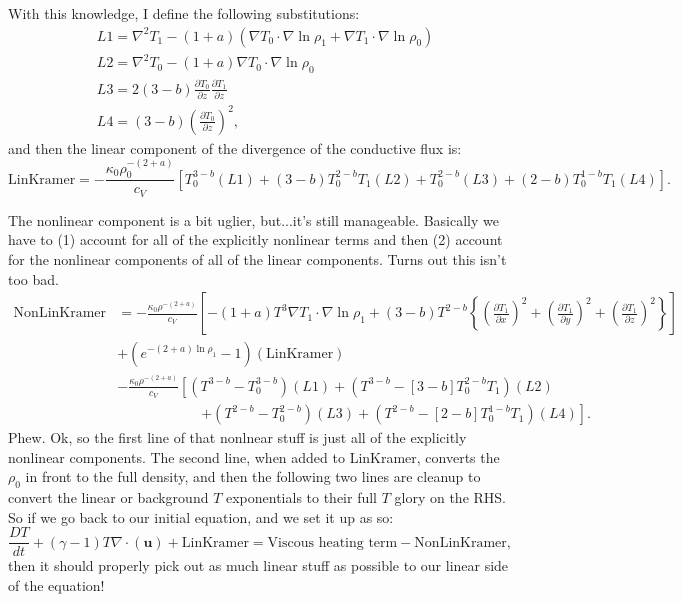 \documentclass[aps, pre, onecolumn, nofootinbib, notitlepage, groupedaddress, amsfonts, amssymb, amsmath, longbibliography]{revtex4-1}
\newcommand{\Div}[1]{\ensuremath{\nabla\cdot\left( #1\right)}}
\newcommand{\grad}{\ensuremath{\nabla}}
\begin{document}
With this knowledge, I define the following substitutions:
\begin{align*}
& L1 = \grad^2 T_1 - (1 + a)(\grad T_0\cdot\grad\ln\rho_1 + \grad T_1\cdot\grad\ln\rho_0) \\
& L2 = \grad^2 T_0 - (1 + a)\grad T_0\cdot\grad\ln\rho_0 \\
& L3 = 2(3-b)\frac{\partial T_0}{\partial z}\frac{\partial T_1}{\partial z} \\
& L4 = (3-b) \left(\frac{\partial T_0}{\partial z}\right)^2,
\end{align*}
and then the linear component of the divergence of the conductive flux is:
\begin{equation}
\boxed{
\text{LinKramer} = -\frac{\kappa_0 \rho_0^{-(2+a)}}{c_V}\left[
T_0^{3-b}(L1) + (3-b)T_0^{2-b}T_1(L2) + T_0^{2-b}(L3) + (2-b)T_0^{1-b}T_1(L4)
\right]
}.
\end{equation}

The nonlinear component is a bit uglier, but...it's still manageable. Basically we
have to (1) account for all of the explicitly nonlinear terms and then (2) account
for the nonlinear components of all of the linear components. Turns out this isn't
too bad.
\begin{equation}
\begin{split}
\text{NonLinKramer} &= -\frac{\kappa_0 \rho^{-(2+a)}}{c_V}\left[
-(1+a)T^3 \grad T_1\cdot\grad\ln\rho_1 + (3-b)T^{2-b}\left\{
\left(\frac{\partial T_1}{\partial x}\right)^2
+\left(\frac{\partial T_1}{\partial y}\right)^2
+\left(\frac{\partial T_1}{\partial z}\right)^2
\right\}\right]\\
&+ \left(e^{-(2+a)\ln\rho_1} - 1\right)(\text{LinKramer}) \\
&- \frac{\kappa_0 \rho^{-(2+a)}}{c_V}\left[
(T^{3-b} - T_0^{3-b})(L1) + (T^{3-b} - [3-b]T_0^{2-b}T_1)(L2)\right.\\
&\qquad\qquad\qquad\left.
+ (T^{2-b} - T_0^{2-b})(L3) + (T^{2-b} - [2-b]T_0^{1-b}T_1)(L4)
\right].
\end{split}
\end{equation}
Phew. Ok, so the first line of that nonlnear stuff is just all of the explicitly
nonlinear components. The second line, when added to LinKramer, converts the
$\rho_0$ in front to the full density, and then the following two lines are cleanup
to convert the linear or background $T$ exponentials to their full $T$ glory on
the RHS.  So if we go back to our initial equation, and we set it up as so:
\begin{equation}
\frac{D T}{d t} + (\gamma-1)T\Div{\bm{u}} 
 + \text{LinKramer} = \text{Viscous heating term} - \text{NonLinKramer},
\end{equation}
then it should properly pick out as much linear stuff as possible to our linear
side of the equation!



\end{document}
